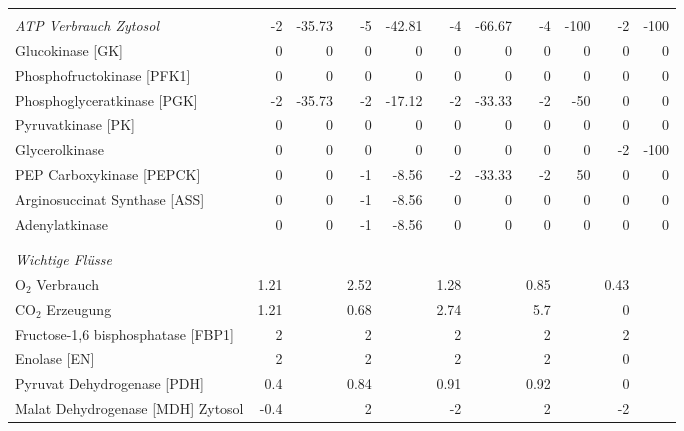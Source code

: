 \begin{landscape}
\begin{table}[!htp]
\begin{tabular}{l rr rr rr rr rr}
 &  &  &  &  &  &  &  &  &  & \\
\textit{ATP Verbrauch Zytosol} & -2 & -35.73 & -5 & -42.81 & -4 & -66.67 & -4 & -100 & -2 & -100\\
\hspace*{5mm}Glucokinase [GK] & 0 & 0 & 0 & 0 & 0 & 0 & 0 & 0 & 0 & 0\\
\hspace*{5mm}Phosphofructokinase [PFK1] & 0 & 0 & 0 & 0 & 0 & 0 & 0 & 0 & 0 & 0\\
\hspace*{5mm}Phosphoglyceratkinase [PGK] & -2 & -35.73 & -2 & -17.12 & -2 & -33.33 & -2 & -50 & 0 & 0\\
\hspace*{5mm}Pyruvatkinase [PK] & 0 & 0 & 0 & 0 & 0 & 0 & 0 & 0 & 0 & 0\\
\hspace*{5mm}Glycerolkinase  & 0 & 0 & 0 & 0 & 0 & 0 & 0 & 0 & -2 & -100\\
\hspace*{5mm}PEP Carboxykinase [PEPCK] & 0 & 0 & -1 & -8.56 & -2 & -33.33 & -2 & 50 & 0 & 0\\
\hspace*{5mm}Arginosuccinat Synthase [ASS] & 0 & 0 & -1 & -8.56 & 0 & 0 & 0 & 0 & 0 & 0\\
\hspace*{5mm}Adenylatkinase & 0 & 0 & -1 & -8.56 & 0 & 0 & 0 & 0 & 0 & 0\\
 &  &  &  &  &  &  &  &  &  & \\
 &  &  &  &  &  &  &  &  &  & \\
\textit{Wichtige Flüsse} &  &  &  &  &  &  &  &  &  & \\
\hspace*{5mm}$\text{O}_2$ Verbrauch & 1.21 &  & 2.52 &  & 1.28 &  & 0.85 &  & 0.43 & \\
\hspace*{5mm}$\text{CO}_2$ Erzeugung & 1.21 &  & 0.68 &  & 2.74 &  & 5.7 &  & 0 & \\
\hspace*{5mm}Fructose-1,6 bisphosphatase [FBP1] & 2 &  & 2 &  & 2 &  & 2 &  & 2 & \\
\hspace*{5mm}Enolase [EN] & 2 &  & 2 &  & 2 &  & 2 &  & 0 & \\
\hspace*{5mm}Pyruvat Dehydrogenase [PDH] & 0.4 &  & 0.84 &  & 0.91 &  & 0.92 &  & 0 & \\
\hspace*{5mm}Malat Dehydrogenase [MDH] Zytosol & -0.4 &  & 2 &  & -2 &  & 2 &  & -2 & \\

\end{tabular}
\end{table}
\end{landscape}
